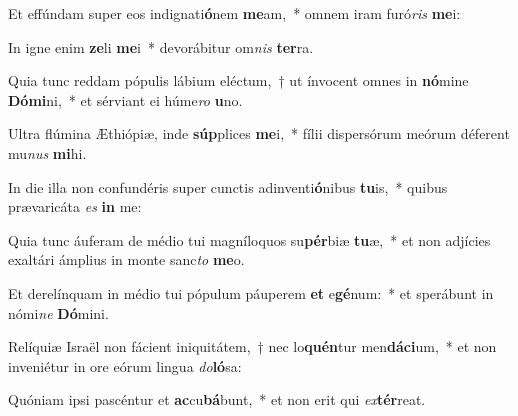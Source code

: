 \item Et effúndam super eos indignati\textbf{ó}nem \textbf{me}am,~* omnem iram furó\textit{ris} \textbf{me}i:
\item In igne enim \textbf{ze}li \textbf{me}i~* devorábitur om\textit{nis} \textbf{ter}ra.
\item Quia tunc reddam pópulis lábium eléctum,~† ut ínvocent omnes in \textbf{nó}mine \textbf{Dó}\textbf{mi}ni,~* et sérviant ei húme\textit{ro} \textbf{u}no.
\item Ultra flúmina Æthiópiæ, inde \textbf{súp}plices \textbf{me}i,~* fílii dispersórum meórum déferent mu\textit{nus} \textbf{mi}hi.
\item In die illa non confundéris super cunctis adinventi\textbf{ó}nibus \textbf{tu}is,~* quibus prævaricáta \textit{es} \textbf{in} me:
\item Quia tunc áuferam de médio tui magníloquos su\textbf{pér}biæ \textbf{tu}æ,~* et non adjícies exaltári ámplius in monte sanc\textit{to} \textbf{me}o.
\item Et derelínquam in médio tui pópulum páuperem \textbf{et} e\textbf{gé}num:~* et sperábunt in nómi\textit{ne} \textbf{Dó}mini.
\item Relíquiæ Israël non fácient iniquitátem,~† nec lo\textbf{quén}tur men\textbf{dá}\textbf{ci}um,~* et non inveniétur in ore eórum lingua \textit{do}\textbf{ló}sa:
\item Quóniam ipsi pascéntur et \textbf{ac}cu\textbf{bá}bunt,~* et non erit qui \textit{ex}\textbf{tér}reat.
